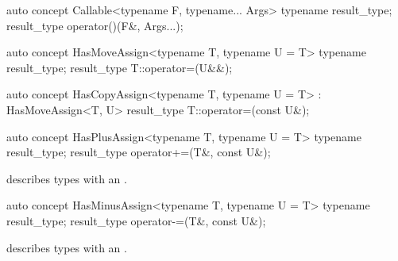\documentclass[american,twoside]{book}
\begin{document}
\begin{itemdecl}
auto concept Callable<typename F, typename... Args> {
  typename result_type;
  result_type operator()(F&, Args...);
}
\end{itemdecl}

\begin{itemdescr}
\pnum 
{}
\end{itemdescr}

\begin{itemdecl}
auto concept HasMoveAssign<typename T, typename U = T> {
  typename result_type;
  result_type T::operator=(U&&);
}
\end{itemdecl}

\begin{itemdescr}
\pnum
{}
\end{itemdescr}

\begin{itemdecl}
auto concept HasCopyAssign<typename T, typename U = T> : HasMoveAssign<T, U> {
  result_type T::operator=(const U&);
}
\end{itemdecl}

\begin{itemdescr}
\pnum
{}
\end{itemdescr}

\begin{itemdecl}
auto concept HasPlusAssign<typename T, typename U = T> {
  typename result_type;
  result_type operator+=(T&, const U&);
}
\end{itemdecl}

\begin{itemdescr}
\pnum
\mbox{\reallynote} describes types with an \mbox{}.
\end{itemdescr}

\begin{itemdecl}
auto concept HasMinusAssign<typename T, typename U = T> {
  typename result_type;
  result_type operator-=(T&, const U&);
}
\end{itemdecl}

\begin{itemdescr}
\pnum
\mbox{\reallynote} describes types with an \mbox{}.
\end{itemdescr}
\end{document}
